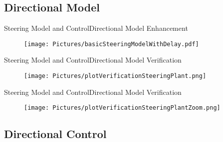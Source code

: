 \subsection{Directional Model}
\begin{frame}{Steering Model and Control}{Directional Model Enhancement}

    \begin{figure}[H]
    \centering
    \texttt{[image: Pictures/basicSteeringModelWithDelay.pdf]}
  \end{figure}
\end{frame}
\begin{frame}{Steering Model and Control}{Directional Model Verification}

    \begin{figure}[H]
    \centering
    \texttt{[image: Pictures/plotVerificationSteeringPlant.png]}
  \end{figure}
\end{frame}
\begin{frame}{Steering Model and Control}{Directional Model Verification}

    \begin{figure}[H]
    \centering
    \texttt{[image: Pictures/plotVerificationSteeringPlantZoom.png]}
  \end{figure}
\end{frame}


\subsection{Directional Control}


